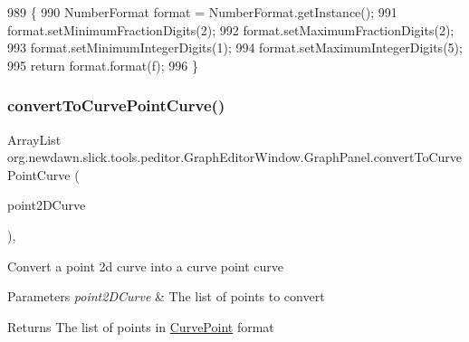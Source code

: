 \begin{DoxyCode}
989                                              \{
990             NumberFormat format = NumberFormat.getInstance();
991             format.setMinimumFractionDigits(2);
992             format.setMaximumFractionDigits(2);
993             format.setMinimumIntegerDigits(1);
994             format.setMaximumIntegerDigits(5);
995             \textcolor{keywordflow}{return} format.format(f);
996         \}
\end{DoxyCode}
\mbox{\label{classorg_1_1newdawn_1_1slick_1_1tools_1_1peditor_1_1_graph_editor_window_1_1_graph_panel_a65f0d6e1015d241f20ac8af73da4480a}} 
\subsubsection{\texorpdfstring{convert\+To\+Curve\+Point\+Curve()}{convertToCurvePointCurve()}}
{\footnotesize\ttfamily Array\+List org.\+newdawn.\+slick.\+tools.\+peditor.\+Graph\+Editor\+Window.\+Graph\+Panel.\+convert\+To\+Curve\+Point\+Curve (\begin{DoxyParamCaption}\item[{Array\+List}]{point2\+D\+Curve }\end{DoxyParamCaption})\hspace{0.3cm}{\ttfamily [inline]}, {\ttfamily [private]}}

Convert a point 2d curve into a curve point curve


\begin{DoxyParams}{Parameters}
{\em point2\+D\+Curve} & The list of points to convert \\
\hline
\end{DoxyParams}
\begin{DoxyReturn}{Returns}
The list of points in \mbox{\hyperlink{classorg_1_1newdawn_1_1slick_1_1tools_1_1peditor_1_1_graph_editor_window_1_1_graph_panel_1_1_curve_point}{Curve\+Point}} format 
\end{DoxyReturn}

